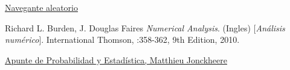 \begin{thebibliography}{9}


\href{http://www-2.dc.uba.ar/materias/metnum/dnload/2018_C1/tp1/Enunciado_TP1.pdf}{Navegante aleatorio}

Richard L. Burden, J. Douglas Faires
\textit{Numerical Analysis}. (Ingles) 
[\textit{An\'alisis num\'erico}]. 
International Thomson, :358-362, 9th Edition, 2010.

\href{http://cms.dm.uba.ar/academico/materias/1ercuat2018/probabilidades_y_estadistica_C/clases.pdf}{Apunte de Probabilidad y Estad\'istica,  Matthieu Jonckheere}

\end{thebibliography}
